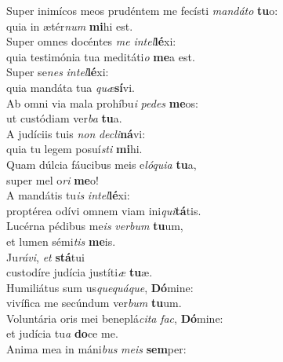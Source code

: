 \evenverse Super inimícos meos prudéntem me fecísti \textit{man}\textit{dá}\textit{to} \textbf{tu}o:~\*\\
\evenverse quia in ætér\textit{num} \textbf{mi}hi est.\\
\oddverse Super omnes docéntes \textit{me} \textit{in}\textit{tel}\textbf{lé}xi:~\*\\
\oddverse quia testimónia tua meditáti\textit{o} \textbf{me}a est.\\
\evenverse Super se\textit{nes} \textit{in}\textit{tel}\textbf{lé}xi:~\*\\
\evenverse quia mandáta tua \textit{quæ}\textbf{sí}vi.\\
\oddverse Ab omni via mala prohíbu\textit{i} \textit{pe}\textit{des} \textbf{me}os:~\*\\
\oddverse ut custódiam ver\textit{ba} \textbf{tu}a.\\
\evenverse A judíciis tuis \textit{non} \textit{de}\textit{cli}\textbf{ná}vi:~\*\\
\evenverse quia tu legem posuí\textit{sti} \textbf{mi}hi.\\
\oddverse Quam dúlcia fáucibus meis e\textit{ló}\textit{qui}\textit{a} \textbf{tu}a,~\*\\
\oddverse super mel o\textit{ri} \textbf{me}o!\\
\evenverse A mandátis tu\textit{is} \textit{in}\textit{tel}\textbf{lé}xi:~\*\\
\evenverse proptérea odívi omnem viam ini\textit{qui}\textbf{tá}tis.\\
\oddverse Lucérna pédibus me\textit{is} \textit{ver}\textit{bum} \textbf{tu}um,~\*\\
\oddverse et lumen sémi\textit{tis} \textbf{me}is.\\
\evenverse Ju\textit{rá}\textit{vi}, \textit{et} \textbf{stá}tui~\*\\
\evenverse custodíre judícia justíti\textit{æ} \textbf{tu}æ.\\
\oddverse Humiliátus sum us\textit{que}\textit{quá}\textit{que}, \textbf{Dó}mine:~\*\\
\oddverse vivífica me secúndum ver\textit{bum} \textbf{tu}um.\\
\evenverse Voluntária oris mei beneplá\textit{ci}\textit{ta} \textit{fac}, \textbf{Dó}mine:~\*\\
\evenverse et judícia tu\textit{a} \textbf{do}ce me.\\
\oddverse Anima mea in máni\textit{bus} \textit{me}\textit{is} \textbf{sem}per:~\*\\
